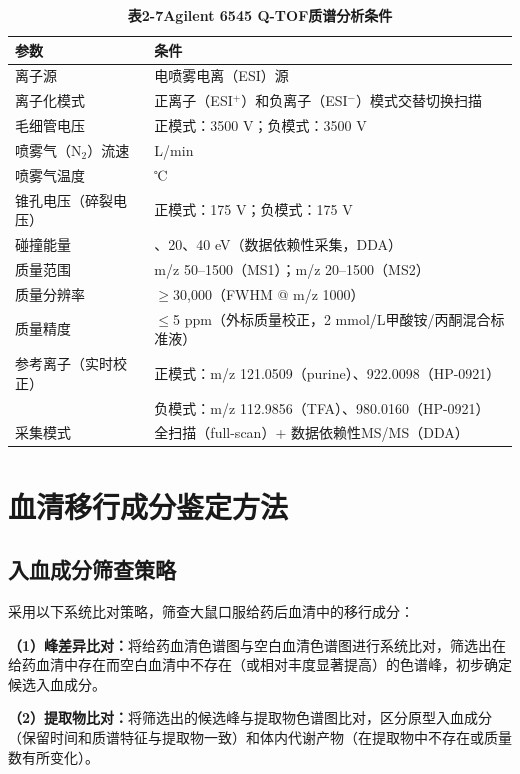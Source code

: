 \documentclass[12pt,a4paper,UTF8,openany]{ctexbook}
\begin{document}
\begin{table}[H]
\centering
\caption{\textbf{表2-7\enspace Agilent 6545 Q-TOF质谱分析条件}}
\label{tab:ms_conditions}
\small
\begin{tabularx}{\textwidth}{>{\raggedright\arraybackslash}p{4.0cm} >{\raggedright\arraybackslash}X}
\toprule
\textbf{参数} & \textbf{条件} \\
\midrule
离子源 & 电喷雾电离（ESI）源 \\
离子化模式 & 正离子（ESI$^+$）和负离子（ESI$^-$）模式交替切换扫描 \\
毛细管电压 & 正模式：3500 V；负模式：3500 V \\
喷雾气（N$_2$）流速 & 10 L/min \\
喷雾气温度 & 325℃ \\
锥孔电压（碎裂电压） & 正模式：175 V；负模式：175 V \\
碰撞能量 & 10、20、40 eV（数据依赖性采集，DDA） \\
质量范围 & m/z 50--1500（MS1）；m/z 20--1500（MS2） \\
质量分辨率 & $\geq$30,000（FWHM @ m/z 1000）\\
质量精度 & $\leq$5 ppm（外标质量校正，2 mmol/L甲酸铵/丙酮混合标准液）\\
参考离子（实时校正） & 正模式：m/z 121.0509（purine）、922.0098（HP-0921）\\
                      & 负模式：m/z 112.9856（TFA）、980.0160（HP-0921）\\
采集模式 & 全扫描（full-scan）+ 数据依赖性MS/MS（DDA）\\
\bottomrule
\end{tabularx}
\end{table}

\section{血清移行成分鉴定方法}

\subsection{入血成分筛查策略}

采用以下系统比对策略，筛查大鼠口服给药后血清中的移行成分：

\textbf{（1）峰差异比对：}将给药血清色谱图与空白血清色谱图进行系统比对，筛选出在给药血清中存在而空白血清中不存在（或相对丰度显著提高）的色谱峰，初步确定候选入血成分。

\textbf{（2）提取物比对：}将筛选出的候选峰与提取物色谱图比对，区分原型入血成分（保留时间和质谱特征与提取物一致）和体内代谢产物（在提取物中不存在或质量数有所变化）。
\end{document}
